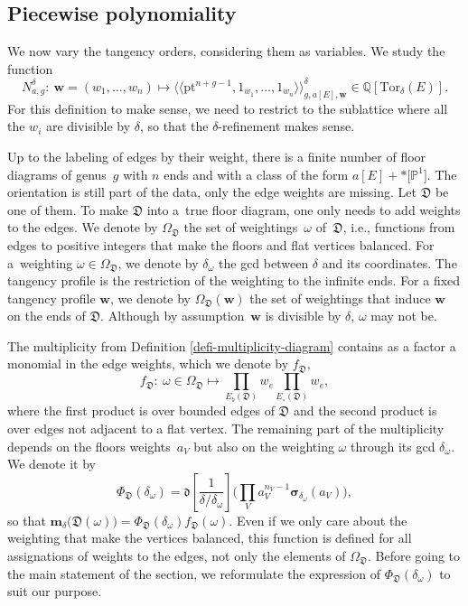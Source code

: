 \documentclass[pdftex]{sigma}
\newcommand{\Tor}{\mathrm{Tor}}
\newcommand{\pt}{\mathrm{pt}}
\renewcommand{\d}[1]{\dfk\left[ #1 \right]}
\newcommand{\PP}{\mathbb{P}}
\newcommand{\QQ}{\mathbb{Q}}
\newcommand{\bfw}{ {\boldsymbol w} }
\newcommand{\Dfk}{\mathfrak{D}}
\newcommand{\dfk}{\mathfrak{d}}
\numberwithin{equation}{section}
\theoremstyle{definition}
\begin{document}
\subsection{Piecewise polynomiality}

We now vary the tangency orders, considering them as variables. We study the function
\[ N^\delta_{a,g}\colon\ \bfw = (w_1,\dots,w_n)\longmapsto \langle\langle\pt^{n+g-1},1_{w_1},\dots,1_{w_n}\rangle\rangle^\delta_{g,a[E],\bfw} \in \QQ[\Tor_\delta(E)]. \]
For this definition to make sense, we need to restrict to the sublattice where all the $w_i$ are divisible by $\delta$, so that the $\delta$-refinement makes sense.

Up to the labeling of edges by their weight, there is a finite number of floor diagrams of genus~$g$ with $n$ ends and with a class of the form $a[E]+\ast \big[\PP^1\big]$. The orientation is still part of the data, only the edge weights are missing. Let $\Dfk$ be one of them. To make $\Dfk$ into a~true floor diagram, one only needs to add weights to the edges. We denote by $\Omega_\Dfk$ the set of weightings~$\omega$ of~$\Dfk$, i.e., functions from edges to positive integers that make the floors and flat vertices balanced. For a~weighting $\omega\in\Omega_\Dfk$, we denote by $\delta_\omega$ the gcd between $\delta$ and its coordinates. The tangency profile is the restriction of the weighting to the infinite ends. For a fixed tangency profile $\bfw$, we denote by $\Omega_\Dfk(\bfw)$ the set of weightings that induce $\bfw$ on the ends of $\Dfk$. Although by assumption~$\bfw$ is divisible by $\delta$, $\omega$ may not be.

The multiplicity from Definition \ref{defi-multiplicity-diagram} contains as a factor a monomial in the edge weights, which we denote by $f_\Dfk$,
\[ f_\Dfk \colon\ \omega\in\Omega_\Dfk\longmapsto \prod_{E_b(\Dfk)}w_e\prod_{E_\circ(\Dfk)} w_e, \]
where the first product is over bounded edges of $\Dfk$ and the second product is over edges not adjacent to a flat vertex. The remaining part of the multiplicity depends on the floors weights~$a_V$ but also on the weighting $\omega$ through its gcd $\delta_\omega$. We denote it by
\[ \Phi_\Dfk(\delta_\omega)=\d{\frac{1}{\delta/\delta_\omega}}\bigg(\prod_V a_V^{n_V-1}\boldsymbol{\sigma}_{\delta_\omega}(a_V)\bigg), \]
so that $\boldsymbol{m}_\delta\bigl(\Dfk(\omega)\bigr)=\Phi_\Dfk(\delta_\omega)f_\Dfk(\omega)$. Even if we only care about the weighting that make the vertices balanced, this function is defined for all assignations of weights to the edges, not only the elements of $\Omega_\Dfk$. Before going to the main statement of the section, we reformulate the expression of $\Phi_\Dfk(\delta_\omega)$ to suit our purpose.
\end{document}

